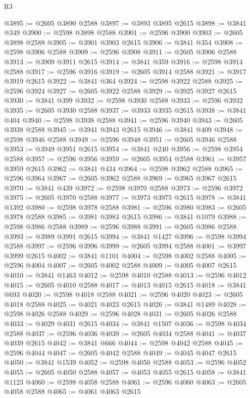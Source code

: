 \begin{lexlean}{R3}
\begin{coremodule}
@3895 := @2605 @3890 @2588
@3897 := @3893 @3895 @2615
@3898 := @3841 @349
@3900 := @2598 @3898 @2588
@3901 := @2596 @3900
@3903 := @2605 @3898 @2588
@3905 := @3901 @3903 @2615
@3906 := @3841 @354
@3908 := @2598 @3906 @2588
@3909 := @2596 @3908
@3911 := @2605 @3906 @2588
@3913 := @3909 @3911 @2615
@3914 := @3841 @359
@3916 := @2598 @3914 @2588
@3917 := @2596 @3916
@3919 := @2605 @3914 @2588
@3921 := @3917 @3919 @2615
@3922 := @3841 @364
@3924 := @2598 @3922 @2588
@3925 := @2596 @3924
@3927 := @2605 @3922 @2588
@3929 := @3925 @3927 @2615
@3930 := @3841 @399
@3932 := @2598 @3930 @2588
@3933 := @2596 @3932
@3935 := @2605 @3930 @2588
@3937 := @3933 @3935 @2615
@3938 := @3841 @404
@3940 := @2598 @3938 @2588
@3941 := @2596 @3940
@3943 := @2605 @3938 @2588
@3945 := @3941 @3943 @2615
@3946 := @3841 @409
@3948 := @2598 @3946 @2588
@3949 := @2596 @3948
@3951 := @2605 @3946 @2588
@3953 := @3949 @3951 @2615
@3954 := @3841 @240
@3956 := @2598 @3954 @2588
@3957 := @2596 @3956
@3959 := @2605 @3954 @2588
@3961 := @3957 @3959 @2615
@3962 := @3841 @434
@3964 := @2598 @3962 @2588
@3965 := @2596 @3964
@3967 := @2605 @3962 @2588
@3969 := @3965 @3967 @2615
@3970 := @3841 @439
@3972 := @2598 @3970 @2588
@3973 := @2596 @3972
@3975 := @2605 @3970 @2588
@3977 := @3973 @3975 @2615
@3978 := @3841 @1392
@3980 := @2598 @3978 @2588
@3981 := @2596 @3980
@3983 := @2605 @3978 @2588
@3985 := @3981 @3983 @2615
@3986 := @3841 @1079
@3988 := @2598 @3986 @2588
@3989 := @2596 @3988
@3991 := @2605 @3986 @2588
@3993 := @3989 @3991 @2615
@3994 := @3841 @1427
@3996 := @2598 @3994 @2588
@3997 := @2596 @3996
@3999 := @2605 @3994 @2588
@4001 := @3997 @3999 @2615
@4002 := @3841 @1101
@4004 := @2598 @4002 @2588
@4005 := @2596 @4004
@4007 := @2605 @4002 @2588
@4009 := @4005 @4007 @2615
@4010 := @3841 @1463
@4012 := @2598 @4010 @2588
@4013 := @2596 @4012
@4015 := @2605 @4010 @2588
@4017 := @4013 @4015 @2615
@4018 := @3841 @693
@4020 := @2598 @4018 @2588
@4021 := @2596 @4020
@4023 := @2605 @4018 @2588
@4025 := @4021 @4023 @2615
@4026 := @3841 @1489
@4028 := @2598 @4026 @2588
@4029 := @2596 @4028
@4031 := @2605 @4026 @2588
@4033 := @4029 @4031 @2615
@4034 := @3841 @1507
@4036 := @2598 @4034 @2588
@4037 := @2596 @4036
@4039 := @2605 @4034 @2588
@4041 := @4037 @4039 @2615
@4042 := @3841 @666
@4044 := @2598 @4042 @2588
@4045 := @2596 @4044
@4047 := @2605 @4042 @2588
@4049 := @4045 @4047 @2615
@4050 := @3841 @1539
@4052 := @2598 @4050 @2588
@4053 := @2596 @4052
@4055 := @2605 @4050 @2588
@4057 := @4053 @4055 @2615
@4058 := @3841 @1123
@4060 := @2598 @4058 @2588
@4061 := @2596 @4060
@4063 := @2605 @4058 @2588
@4065 := @4061 @4063 @2615

\end{coremodule}
\end{lexlean}
